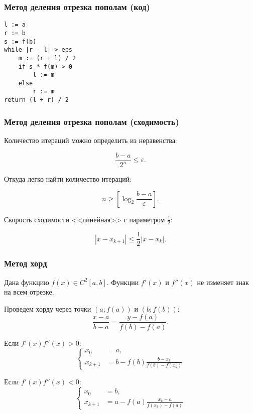 \documentclass[10pt]{beamer}
\begin{document}
\begin{frame}[fragile]
\frametitle{Метод деления отрезка пополам (код)}

\begin{lstlisting}
l := a
r := b
s := f(b)
while |r - l| > eps
    m := (r + l) / 2
    if s * f(m) > 0
        l := m
    else
        r := m
return (l + r) / 2
\end{lstlisting}
\end{frame}


\begin{frame}[fragile]
\frametitle{Метод деления отрезка пополам (сходимость)}

Количество итераций можно определить из неравенства:

$$ \frac{b - a}{2^n} \le \varepsilon .$$

Откуда легко найти количество итераций:

$$ n \ge \left[ \log_2 {\frac{b - a}{\varepsilon}} \right].$$

Скорость сходимости <<линейная>> с параметром $\frac{1}{2}$:

$$|x - x_{k+1}| \le \frac{1}{2} |x - x_{k}|.$$
\end{frame}


\begin{frame}[fragile]
\frametitle{Метод хорд}

Дана функцию $f(x) \in C^{2}[a, b]$. Функции $f'(x)$ и $f''(x)$ не изменяет знак на всем отрезке. 

\vfill

Проведем хорду через точки $(a; f(a))$ и $(b; f(b))$:
$$\frac{x-a}{b-a} = \frac{y-f(a)}{f(b)-f(a)}.$$

\vfill

Если $f'(x) f''(x) > 0$: 
$$
\begin{cases}
x_0 &= a,\\
x_{k+1} &= b - f(b) \frac{b-x_k}{f(b)-f(x_k)}
\end{cases}
$$

\vfill

Если $f'(x) f''(x) < 0$: 
$$
\begin{cases}
x_0 &= b,\\
x_{k+1} &= a - f(a) \frac{x_k-a}{f(x_k)-f(a)}
\end{cases}
$$


\end{frame}
\end{document}
